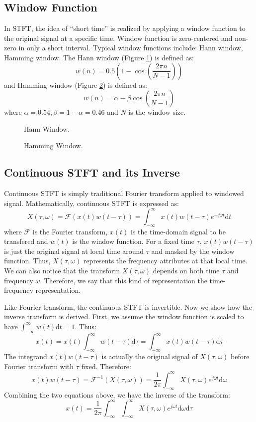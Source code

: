 \documentclass[11pt,a4paper]{report}
\begin{document}
\subsection{Window Function}
In STFT, the idea of ``short time'' is realized by applying a window function to the original signal at a specific time. Window function is zero-centered and non-zero in only a short interval. Typical window functions include: Hann window, Hamming window\cite{heinzel_spectrum_2002}. The Hann window (Figure \ref{fig:hann}) is defined as:
\[ w(n) = 0.5 (1 - \cos(\frac{2\pi n}{N-1})) \]
and Hamming window (Figure \ref{fig:hamming}) is defined as:
\[ w(n) = \alpha - \beta \cos(\frac{2\pi n}{N-1}) \]
where $\alpha = 0.54, \beta = 1 - \alpha = 0.46$ and $N$ is the window size.

\begin{figure}[htbp]
  \centering
  {\small
  
  }
  \caption[Hann Window]{Hann Window.}
  \label{fig:hann}
\end{figure}

\begin{figure}[htbp]
  \centering
  {\small
  
  }
  \caption[Hamming Window]{Hamming Window.}
  \label{fig:hamming}
\end{figure}

\subsection{Continuous STFT and its Inverse}
Continuous STFT is simply traditional Fourier transform applied to windowed signal. Mathematically, continuous STFT is expressed as:
\[ X(\tau, \omega) = \mathcal{F}(x(t)w(t-\tau)) =  \int_{-\infty}^{\infty} x(t)w(t-\tau)e^{-j\omega t}\mathrm{d}t \]
where $\mathcal{F}$ is the Fourier transform, $x(t)$ is the time-domain signal to be transfered and $w(t)$ is the window function. For a fixed time $\tau$, $x(t)w(t-\tau)$ is just the original signal at local time around $\tau$ and masked by the window function. Thus, $X(\tau, \omega)$ represents the frequency attributes at that local time. We can also notice that the transform $X(\tau, \omega)$ depends on both time $\tau$ and frequency $\omega$. Therefore, we say that this kind of representation the time-frequency representation.

Like Fourier transform, the continuous STFT is invertible. Now we show how the inverse transform is derived. First, we assume the window function is scaled to have $\int_{-\infty}^{\infty} w(t) \mathrm{d}t = 1$. Thus:
\[
  x(t) = x(t) \int_{-\infty}^{\infty} w(t-\tau) \mathrm{d}\tau = \int_{-\infty}^{\infty} x(t)w(t-\tau) \mathrm{d}\tau
\]
The integrand $x(t)w(t-\tau)$ is actually the original signal of $X(\tau, \omega)$ before Fourier transform with $\tau$ fixed. Therefore:
\[ x(t)w(t-\tau) = \mathcal{F}^{-1}(X(\tau, \omega)) = \frac{1}{2\pi} \int_{-\infty}^{\infty} X(\tau, \omega) e^{j\omega t} \mathrm{d}\omega \]
Combining the two equations above, we have the inverse of the transform:
\[ x(t) = \frac{1}{2\pi} \int_{-\infty}^{\infty} \int_{-\infty}^{\infty} X(\tau, \omega) e^{j\omega t} \mathrm{d}\omega \mathrm{d}\tau \]
\end{document}
